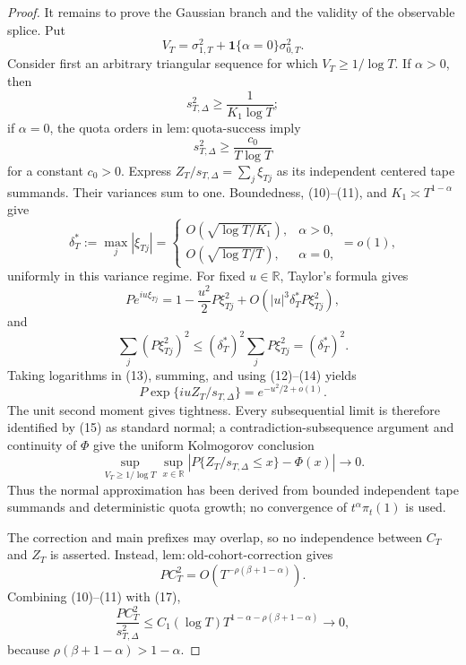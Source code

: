 \documentclass{article}
\begin{document}
\begin{proof}
It remains to prove the Gaussian branch and the validity of the observable splice.  Put
\[
 V_T=\sigma_{1,T}^2+\mathbf 1\{\alpha=0\}\sigma_{0,T}^2. \tag{9}
\]
Consider first an arbitrary triangular sequence for which \(V_T\geq1/\log T\).  If \(\alpha>0\), then
\[
 s_{T,\Delta}^2\geq\frac{1}{K_1\log T}; \tag{10}
\]
if \(\alpha=0\), the quota orders in \(\mathrm{lem:quota\text{-}success}\) imply
\[
 s_{T,\Delta}^2\geq\frac{c_0}{T\log T} \tag{11}
\]
for a constant \(c_0>0\).  Express \(Z_T/s_{T,\Delta}=\sum_j\xi_{Tj}\) as its independent centered tape summands.  Their variances sum to one.  Boundedness, (10)--(11), and \(K_1\asymp T^{1-\alpha}\) give
\[
 \delta_T^*:=\max_j|\xi_{Tj}|=
 \begin{cases}
 O\!\left(\sqrt{\log T/K_1}\right),&\alpha>0,\\
 O\!\left(\sqrt{\log T/T}\right),&\alpha=0,
 \end{cases}
 =o(1), \tag{12}
\]
uniformly in this variance regime.  For fixed \(u\in\mathbb R\), Taylor's formula gives
\[
 P e^{iu\xi_{Tj}}=1-\frac{u^2}{2}P\xi_{Tj}^2
 +O\!\left(|u|^3\delta_T^*P\xi_{Tj}^2\right), \tag{13}
\]
and
\[
 \sum_j(P\xi_{Tj}^2)^2\leq(\delta_T^*)^2\sum_jP\xi_{Tj}^2=(\delta_T^*)^2. \tag{14}
\]
Taking logarithms in (13), summing, and using (12)--(14) yields
\[
 P\exp\{iuZ_T/s_{T,\Delta}\}=e^{-u^2/2+o(1)}. \tag{15}
\]
The unit second moment gives tightness.  Every subsequential limit is therefore identified by (15) as standard normal; a contradiction-subsequence argument and continuity of \(\Phi\) give the uniform Kolmogorov conclusion
\[
 \sup_{V_T\geq1/\log T}\sup_{x\in\mathbb R}
 \left|P\{Z_T/s_{T,\Delta}\leq x\}-\Phi(x)\right|\longrightarrow0. \tag{16}
\]
Thus the normal approximation has been derived from bounded independent tape summands and deterministic quota growth; no convergence of \(t^\alpha\pi_t(1)\) is used.

The correction and main prefixes may overlap, so no independence between \(C_T\) and \(Z_T\) is asserted.  Instead, \(\mathrm{lem:old\text{-}cohort\text{-}correction}\) gives
\[
 PC_T^2=O\!\left(T^{-\rho(\beta+1-\alpha)}\right). \tag{17}
\]
Combining (10)--(11) with (17),
\[
 \frac{PC_T^2}{s_{T,\Delta}^2}
 \leq C_1(\log T)T^{1-\alpha-\rho(\beta+1-\alpha)}\longrightarrow0, \tag{18}
\]
because \(\rho(\beta+1-\alpha)>1-\alpha\).


\end{proof}
\end{document}
